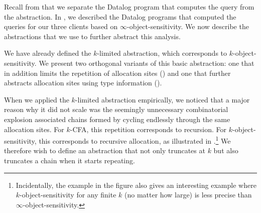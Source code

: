
Recall from  that we separate the Datalog program that
computes the query from the abstraction.  In , we described
the Datalog programs that computed the queries for our three clients based on
$\infty$-object-sensitivity.  We now describe the abstractions that we use to
further abstract this analysis.

We have already defined the $k$-limited abstraction, which corresponds to
$k$-object-sensitivity.  We present two orthogonal variants of this basic abstraction: one that in
addition limits the repetition of allocation sites ()
and one that further abstracts allocation sites using type information
().


When we applied the $k$-limited abstraction empirically,
we noticed that a major reason why it did not scale was
the seemingly unnecessary combinatorial explosion associated chains formed
by cycling endlessly through the same allocation sites.
For $k$-CFA, this repetition corresponds to recursion.
For $k$-object-sensitivity, this corresponds to recursive allocation, as
illustrated in .\footnote{
Incidentally, the example in the figure also gives an interesting example where
$k$-object-sensitivity for any finite $k$ (no matter how large) is less precise
than $\infty$-object-sensitivity.}
We therefore wish to define an abstraction that not only truncates at $k$ but also truncates
a chain when it starts repeating.

